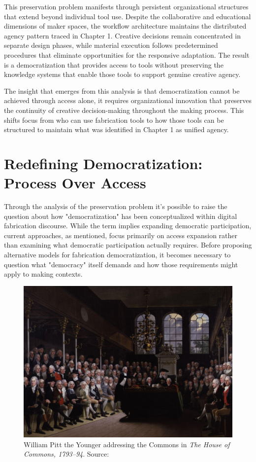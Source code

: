 This preservation problem manifests through persistent organizational structures that extend beyond individual tool use. Despite the collaborative and educational dimensions of maker spaces, the workflow architecture maintains the distributed agency pattern traced in Chapter 1. Creative decisions remain concentrated in separate design phases, while material execution follows predetermined procedures that eliminate opportunities for the responsive adaptation. The result is a democratization that provides access to tools without preserving the knowledge systems that enable those tools to support genuine creative agency.

\vspace{0.5cm}

The insight that emerges from this analysis is that democratization cannot be achieved through access alone, it requires organizational innovation that preserves the continuity of creative decision-making throughout the making process. This shifts focus from who can use fabrication tools to how those tools can be structured to maintain what was identified in Chapter 1 as unified agency. 

\section{Redefining Democratization: Process Over Access}

Through the analysis of the preservation problem it's possible to raise the question about how "democratization" has been conceptualized within digital fabrication discourse. While the term implies expanding democratic participation, current approaches, as mentioned, focus primarily on access expansion rather than examining what democratic participation actually requires. Before proposing alternative models for fabrication democratization, it becomes necessary to question what "democracy" itself demands and how those requirements might apply to making contexts.

\begin{figure}[H]
\centering
\includegraphics[width=1\textwidth]{figures/chapter2/The_House_of_Commons_1793-94.jpg}
\caption{William Pitt the Younger addressing the Commons in \textit{The House of Commons, 1793–94}. Source: \citet{hickel_commons_1794}}
\label{fig:house_of_commons_1794}
\end{figure}

